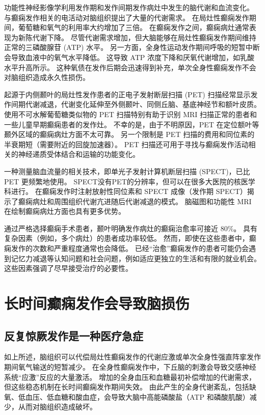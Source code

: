 功能性神经影像学利用发作期和发作间期发作病灶中发生的脑代谢和血流变化。
与癫痫发作相关的电活动对脑组织提出了大量的代谢需求。
在局灶性癫痫发作期间，葡萄糖和氧气的利用率大约增加了三倍。
在癫痫发作之间，癫痫病灶通常表现为新陈代谢下降。
尽管代谢需求增加，但大脑能够在局灶性癫痫发作期间维持正常的三磷酸腺苷 (ATP) 水平。
另一方面，全身性运动发作期间呼吸的短暂中断会导致血液中的氧气水平降低。
这导致 ATP 浓度下降和厌氧代谢增加，如乳酸水平升高所示。
这种氧债在发作后期会迅速得到补充，单次全身性癫痫发作不会对脑组织造成永久性损伤。


起源于内侧颞叶的局灶性发作患者的正电子发射断层扫描 (PET) 扫描经常显示发作间期代谢减退，代谢变化延伸至外侧颞叶、同侧丘脑、基底神经节和额叶皮质。
使用不可水解葡萄糖类似物的 PET 扫描特别有助于识别 MRI 扫描正常的患者和一些儿童早期癫痫患者的发作灶。
不幸的是，由于不明原因，PET 在定位额叶等颞外区域的癫痫病灶方面不太可靠。
另一个限制是 PET 扫描的费用和同位素的半衰期短（需要附近的回旋加速器）。
PET 扫描还可用于寻找与癫痫发作活动相关的神经递质受体结合和运输的功能变化。


一种测量脑血流量的相关技术，即单光子发射计算机断层扫描 (SPECT)，已比 PET 更频繁地使用。
SPECT没有PET的分辨率，但可以在很多大医院的核医学科进行。
在癫痫发作时注射放射性同位素和 SPECT 成像（发作期 SPECT）揭示了癫痫病灶和周围组织代谢亢进随后代谢减退的模式。
脑磁图和功能性 MRI 在绘制癫痫病灶方面也具有更多优势。


通过严格选择癫痫手术患者，颞叶明确发作病灶的癫痫治愈率可接近 80\%。
具有复杂因素（例如，多个病灶）的患者成功率较低。
然而，即使在这些患者中，癫痫发作的次数和严重程度通常也会降低。
已经“治愈”癫痫发作的患者可能仍会遇到记忆力减退等认知问题和社会问题，例如适应更独立的生活和有限的就业机会。
这些因素强调了尽早接受治疗的必要性。



\section{长时间癫痫发作会导致脑损伤}

\subsection{反复惊厥发作是一种医疗急症}

如上所述，脑组织可以代偿局灶性癫痫发作的代谢应激或单次全身性强直阵挛发作期间氧气输送的短暂减少。
在全身性癫痫发作中，下丘脑的刺激会导致交感神经系统“应激”反应的大量激活。
增加的全身血压和血糖最初补偿增加的代谢需求，但这些稳态机制在长时间癫痫发作期间失效。
由此产生的全身代谢紊乱，包括缺氧、低血压、低血糖和酸血症，会导致大脑中高能磷酸盐（ATP 和磷酸肌酸）减少，从而对脑组织造成破坏。


